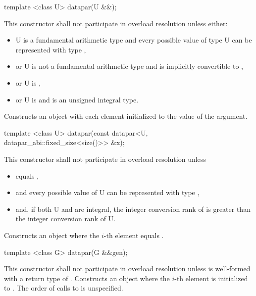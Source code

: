 \begin{itemdecl}
template <class U> datapar(U &&);
\end{itemdecl}
\begin{itemdescr}
  \pnum\remarks This constructor shall not participate in overload resolution unless either:
  \begin{itemize}
    \item \type U is a fundamental arithmetic type and every possible value of type \type U can be represented with type ,
    \item or \type U is not a fundamental arithmetic type and is implicitly convertible to ,
    \item or \type U is \intt,
    \item or \type U is \uint and  is an unsigned integral type.
  \end{itemize}
  \pnum\effects Constructs an object with each element initialized to the value of the argument.
\end{itemdescr}

\begin{itemdecl}
template <class U> datapar(const datapar<U, datapar_abi::fixed_size<size()>> &x);
\end{itemdecl}
\begin{itemdescr}
  \pnum\remarks This constructor shall not participate in overload resolution unless
  \begin{itemize}
    \item {} equals \fixedsizescoped{},
    \item and every possible value of \type U can be represented with type ,
    \item and, if both \type U and  are integral, the integer conversion rank \parencite[(4.15)]{N4618} of  is greater than the integer conversion rank of \type U.
  \end{itemize}
  \pnum\effects Constructs an object where the $i$-th element equals  \foralli.
\end{itemdescr}

\begin{itemdecl}
template <class G> datapar(G &&gen);
\end{itemdecl}
\begin{itemdescr}
  \pnum\remarks This constructor shall not participate in overload resolution unless  is well-formed with a return type of .
  \pnum\effects Constructs an object where the $i$-th element is initialized to .
  \pnum\remarks The order of calls to  is unspecified.
\end{itemdescr}

